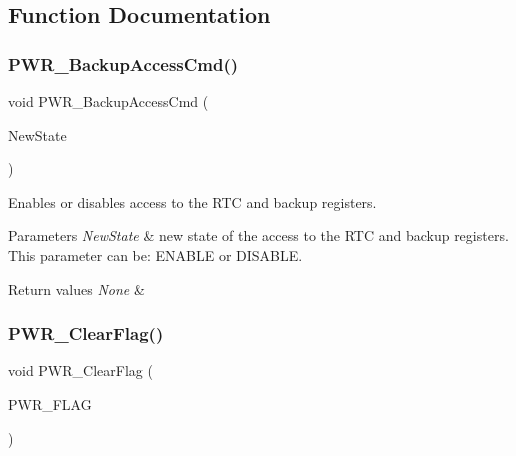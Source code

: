\subsection{Function Documentation}
\mbox{\label{group___p_w_r___private___functions_ga0741aea35572b1a75f82b74de12df800}} 
\subsubsection{\texorpdfstring{PWR\_BackupAccessCmd()}{PWR\_BackupAccessCmd()}}
{\footnotesize\ttfamily void P\+W\+R\+\_\+\+Backup\+Access\+Cmd (\begin{DoxyParamCaption}\item[{\mbox{\hyperlink{group___exported__types_gac9a7e9a35d2513ec15c3b537aaa4fba1}{Functional\+State}}}]{New\+State }\end{DoxyParamCaption})}



Enables or disables access to the R\+TC and backup registers. 


\begin{DoxyParams}{Parameters}
{\em New\+State} & new state of the access to the R\+TC and backup registers. This parameter can be\+: E\+N\+A\+B\+LE or D\+I\+S\+A\+B\+LE. \\
\hline
\end{DoxyParams}

\begin{DoxyRetVals}{Return values}
{\em None} & \\
\hline
\end{DoxyRetVals}
\mbox{\label{group___p_w_r___private___functions_ga01c4b2fbd16514b993324e101c3ddf7c}} 
\subsubsection{\texorpdfstring{PWR\_ClearFlag()}{PWR\_ClearFlag()}}
{\footnotesize\ttfamily void P\+W\+R\+\_\+\+Clear\+Flag (\begin{DoxyParamCaption}\item[{uint32\+\_\+t}]{P\+W\+R\+\_\+\+F\+L\+AG }\end{DoxyParamCaption})}



